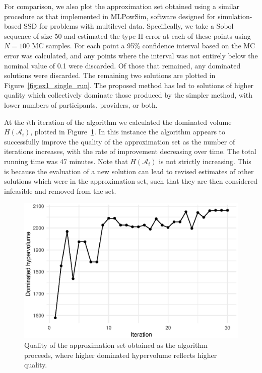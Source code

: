 \documentclass{article}
\begin{document}
For comparison, we also plot the approximation set obtained using a similar procedure as that implemented in MLPowSim, software designed for simulation-based SSD for problems with multilevel data. Specifically, we take a Sobol sequence of size 50 and estimated the type II error at each of these points using $N = 100$ MC samples. For each point a 95\% confidence interval based on the MC error was calculated, and any points where the interval was not entirely below the nominal value of 0.1 were discarded. Of those that remained, any dominated solutions were discarded. The remaining two solutions are plotted in Figure~\ref{fig:ex1_single_run}. The proposed method has led to solutions of higher quality which collectively dominate those produced by the simpler method, with lower numbers of participants, providers, or both.

At the $i$th iteration of the algorithm we calculated the dominated volume $H(\mathcal{A}_{i})$, plotted in Figure~\ref{fig:ex1_traj}. In this instance the algorithm appears to successfully improve the quality of the approximation set as the number of iterations increases, with the rate of improvement decreasing over time. The total running time was 47 minutes. Note that $H(\mathcal{A}_{i})$ is not strictly increasing. This is because the evaluation of a new solution can lead to revised estimates of other solutions which were in the approximation set, such that they are then considered infeasible and removed from the set. 

\begin{figure}
\centering
\includegraphics[scale=0.8]{ex1_traj}
\caption{Quality of the approximation set obtained as the algorithm proceeds, where higher dominated hypervolume reflects higher quality.}
\label{fig:ex1_traj}
\end{figure}
\end{document}
